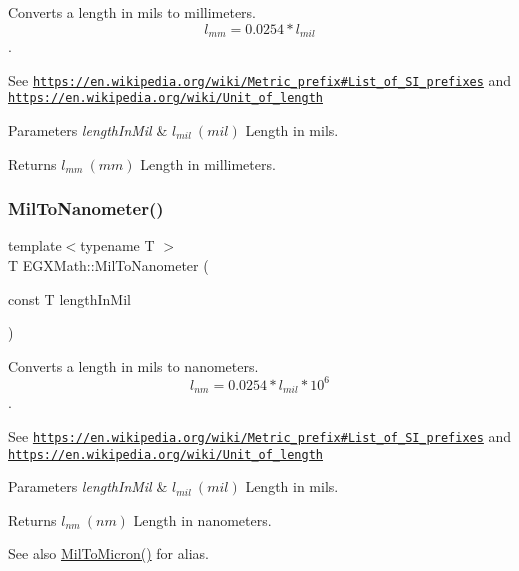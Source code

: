 Converts a length in mils to millimeters. \[ l_{mm}=0.0254* l_{mil} \]. 

See \href{https://en.wikipedia.org/wiki/Metric_prefix#List_of_SI_prefixes}{\tt https\+://en.\+wikipedia.\+org/wiki/\+Metric\+\_\+prefix\#\+List\+\_\+of\+\_\+\+S\+I\+\_\+prefixes} and \href{https://en.wikipedia.org/wiki/Unit_of_length}{\tt https\+://en.\+wikipedia.\+org/wiki/\+Unit\+\_\+of\+\_\+length} 
\begin{DoxyParams}{Parameters}
{\em length\+In\+Mil} & $ l_{mil}\ (mil)$ Length in mils. \\
\hline
\end{DoxyParams}
\begin{DoxyReturn}{Returns}
$ l_{mm}\ (mm)$ Length in millimeters. 
\end{DoxyReturn}
\mbox{\label{group___e_g_x_math-_conversions-_length_conversions-_imperial-_mil-_s_i_gaf5c65c9790e4478084a2dbbc62e15d93}} 
\subsubsection{\texorpdfstring{Mil\+To\+Nanometer()}{MilToNanometer()}}
{\footnotesize\ttfamily template$<$typename T $>$ \\
T E\+G\+X\+Math\+::\+Mil\+To\+Nanometer (\begin{DoxyParamCaption}\item[{const T}]{length\+In\+Mil }\end{DoxyParamCaption})}



Converts a length in mils to nanometers. \[ l_{nm}=0.0254* l_{mil} * 10^{6} \]. 

See \href{https://en.wikipedia.org/wiki/Metric_prefix#List_of_SI_prefixes}{\tt https\+://en.\+wikipedia.\+org/wiki/\+Metric\+\_\+prefix\#\+List\+\_\+of\+\_\+\+S\+I\+\_\+prefixes} and \href{https://en.wikipedia.org/wiki/Unit_of_length}{\tt https\+://en.\+wikipedia.\+org/wiki/\+Unit\+\_\+of\+\_\+length} 
\begin{DoxyParams}{Parameters}
{\em length\+In\+Mil} & $ l_{mil}\ (mil)$ Length in mils. \\
\hline
\end{DoxyParams}
\begin{DoxyReturn}{Returns}
$ l_{nm}\ (nm)$ Length in nanometers. 
\end{DoxyReturn}
\begin{DoxySeeAlso}{See also}
\mbox{\hyperlink{group___e_g_x_math-_conversions-_length_conversions-_imperial-_mil-_non-_s_i_gab38b772b1b070729756dcdc87826f5d0}{Mil\+To\+Micron()}} for alias. 
\end{DoxySeeAlso}
\mbox{\label{group___e_g_x_math-_conversions-_length_conversions-_imperial-_mil-_s_i_ga43688f460a753350b8b4ac32c83bbf5e}} 
